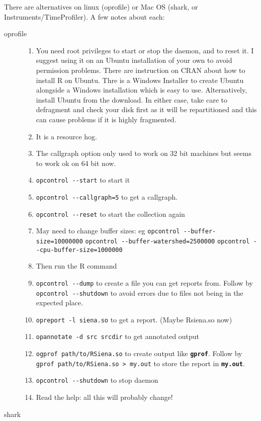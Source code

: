 \documentclass[12pt, a4paper]{article}
\renewcommand{\=}{\,=\,}
\newcommand{\+}{\,+\,}
\newcommand{\sfn}[1]{\textbf{\texttt{#1}}}
\begin{document}
There are alternatives on linux (\textsf{oprofile}) or Mac OS (\textsf{shark},
or
\textsf{Instruments/TimeProfiler}).
A few notes about each:
\begin{description}
\item[oprofile]
\begin{enumerate}
\item You need root privileges to start or stop the daemon, and to reset it. I
  suggest using it on an Ubuntu installation of your own to avoid permission
  problems. There are instruction on CRAN about how to install R on Ubuntu. Thre
  is a Windows Installer to create Ubuntu alongside a Windows installation which
  is easy to use. Alternatively, install Ubuntu from the download. In either
  case, take care to defragment and check your disk first as it will be
  repartitioned and this can cause problems if it is highly fragmented.
\item It is a resource hog.
\item The callgraph option only used to work on 32 bit machines but seems to
  work ok on 64 bit now.
\item \verb|opcontrol --start| to start it
\item \verb|opcontrol --callgraph=5| to get a callgraph.
\item \verb|opcontrol --reset| to start the collection again
\item May need to change buffer sizes: eg
\verb|opcontrol --buffer-size=10000000|
\verb|opcontrol --buffer-watershed=2500000|
\verb|opcontrol --cpu-buffer-size=1000000|
\item Then run the R command
\item \verb|opcontrol --dump| to create a file you can get reports from.
Follow by \verb|opcontrol --shutdown| to avoid errors due to files not being in
the expected place.
\item \verb|opreport -l siena.so| to get a report. (Maybe Rsiena.so now)
\item \verb|opannotate -d src srcdir| to get annotated output
\item \verb|ogprof path/to/RSiena.so| to create output like \sfn{gprof}.
Follow by
\verb|gprof path/to/RSiena.so > my.out| to store the report in \sfn{my.out}.
\item \verb|opcontrol --shutdown| to stop daemon
\item Read the help: all this will probably change!
\end{enumerate}
\item[shark]
\begin{enumerate}

\end{enumerate}
\end{description}
\end{document}
